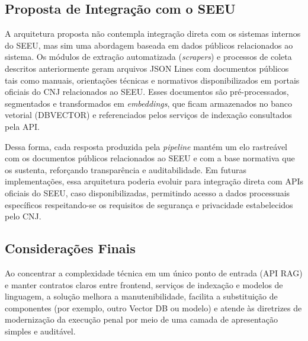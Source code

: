 \subsection{Proposta de Integração com o SEEU}
A arquitetura proposta não contempla integração direta com os sistemas internos do SEEU, mas sim uma abordagem baseada em dados públicos relacionados ao sistema. Os módulos de extração automatizada (\textit{scrapers}) e processos de coleta descritos anteriormente geram arquivos JSON Lines com documentos públicos tais como manuais, orientações técnicas e normativos disponibilizados em portais oficiais do CNJ relacionados ao SEEU. Esses documentos são pré-processados, segmentados e transformados em \textit{embeddings}, que ficam armazenados no banco vetorial (DBVECTOR) e referenciados pelos serviços de indexação consultados pela API.

Dessa forma, cada resposta produzida pela \textit{pipeline} mantém um elo rastreável com os documentos públicos relacionados ao SEEU e com a base normativa que os sustenta, reforçando transparência e auditabilidade. Em futuras implementações, essa arquitetura poderia evoluir para integração direta com APIs oficiais do SEEU, caso disponibilizadas, permitindo acesso a dados processuais específicos respeitando-se os requisitos de segurança e privacidade estabelecidos pelo CNJ.

\subsection{Considerações Finais}
Ao concentrar a complexidade técnica em um único ponto de entrada (API RAG) e manter contratos claros entre frontend, serviços de indexação e modelos de linguagem, a solução melhora a manutenibilidade, facilita a substituição de componentes (por exemplo, outro Vector DB ou modelo) e atende às diretrizes de modernização da execução penal por meio de uma camada de apresentação simples e auditável.
